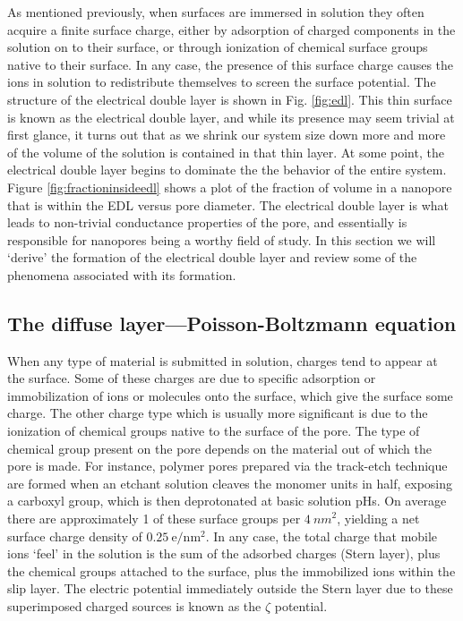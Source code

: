 			As mentioned previously, when surfaces are immersed in solution they often acquire a finite surface charge, either by adsorption of charged components in the solution on to their surface, or through ionization of chemical surface groups native to their surface. In any case, the presence of this surface charge causes the ions in solution to redistribute themselves to screen the surface potential. The structure of the electrical double layer is shown in Fig. \ref{fig:edl}. This thin surface is known as the electrical double layer, and while its presence may seem trivial at first glance, it turns out that as we shrink our system size down more and more of the volume of the solution is contained in that thin layer. At some point, the electrical double layer begins to dominate the the behavior of the entire system. Figure \ref{fig:fractioninsideedl} shows a plot of the fraction of volume in a nanopore that is within the EDL versus pore diameter. The electrical double layer is what leads to non-trivial conductance properties of the pore, and essentially is responsible for nanopores being a worthy field of study. In this section we will `derive' the formation of the electrical double layer and review some of the phenomena associated with its formation. 
			

		\subsection{The diffuse layer---Poisson-Boltzmann equation}
			
			When any type of material is submitted in solution, charges tend to appear at the surface. Some of these charges are due to specific adsorption or immobilization of ions or molecules onto the surface, which give the surface some charge. The other charge type which is usually more significant is due to the ionization of chemical groups native to the surface of the pore. The type of chemical group present on the pore depends on the material out of which the pore is made. For instance, polymer pores prepared via the track-etch technique are formed when an etchant solution cleaves the monomer units in half, exposing a carboxyl group, which is then deprotonated at basic solution pHs. On average there are approximately 1 of these surface groups per $\SI{4}{nm}^{2}$, yielding a net surface charge density of $0.25~\mathrm{e}/\mathrm{nm}^{2}$. In any case, the total charge that mobile ions `feel' in the solution is the sum of the adsorbed charges (Stern layer), plus the chemical groups attached to the surface, plus the immobilized ions within the slip layer. The electric potential immediately outside the Stern layer due to these superimposed charged sources is known as the $\zeta$ potential.
			

